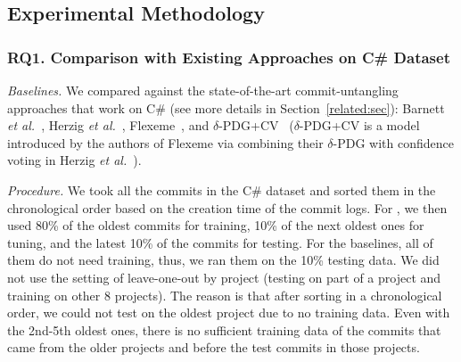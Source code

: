 

\subsection{Experimental Methodology}
\label{method:sec}

\subsubsection{RQ1. Comparison with Existing Approaches on C\# Dataset}


{\em Baselines.} We compared {\tool} against the
state-of-the-art commit-untangling approaches that work on C\#
(see more details in Section~\ref{related:sec}): Barnett {\em et
al.}~\cite{barnett-icse15}, Herzig {\em et al.}~\cite{kim-emse16},
Flexeme~\cite{flexeme-fse20}, and $\delta$-PDG+CV~\cite{flexeme-fse20}
($\delta$-PDG+CV is a model introduced by the authors of Flexeme via
combining their $\delta$-PDG with confidence voting in Herzig {\em et
al.}~\cite{kim-emse16}).



\textit{Procedure.}
We took all the commits in the C\# dataset and sorted them in the
chronological order based on the creation time of the commit logs. For
{\tool}, we then used 80\% of the oldest commits for training, 10\% of
the next oldest ones for tuning, and the latest 10\% of the commits
for testing. For the baselines, all of them do not need training,
thus, we ran them on the 10\% testing data.
%
We did not use the setting of leave-one-out by project (testing on
part of a project and training on other 8 projects). The reason is
that after sorting in a chronological order, we could not test on the
oldest project due to no training data. Even with the 2nd-5th oldest
ones, there is no sufficient training data of the commits that came
from the older projects and before the test commits in those projects.

